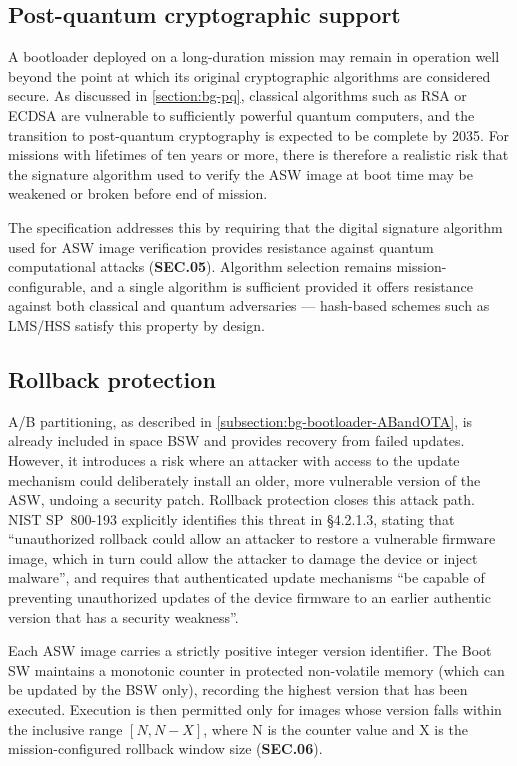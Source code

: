 \subsection{Post-quantum cryptographic support}

A bootloader deployed on a long-duration mission may remain in operation well beyond the point at which its original cryptographic algorithms are considered secure. As discussed in \autoref{section:bg-pq}, classical algorithms such as RSA or ECDSA are vulnerable to sufficiently powerful quantum computers, and the transition to post-quantum cryptography is expected to be complete by 2035. For missions with lifetimes of ten years or more, there is therefore a realistic risk that the signature algorithm used to verify the ASW image at boot time may be weakened or broken before end of mission.

The specification addresses this by requiring that the digital signature algorithm used for ASW image verification provides resistance against quantum computational attacks (\textbf{SEC.05}). Algorithm selection remains mission-configurable, and a single algorithm is sufficient provided it offers resistance against both classical and quantum adversaries — hash-based schemes such as LMS/HSS satisfy this property by design.

\subsection{Rollback protection}

A/B partitioning, as described in \autoref{subsection:bg-bootloader-ABandOTA}, is already included in space BSW and provides recovery from failed updates. However, it introduces a risk where an attacker with access to the update mechanism could deliberately install an older, more vulnerable version of the ASW, undoing a security patch. Rollback protection closes this attack path. NIST SP~800-193 \cite{NIST-sp-800-193} explicitly identifies this threat in §4.2.1.3, stating that ``unauthorized rollback could allow an attacker to restore a vulnerable firmware image, which in turn could allow the attacker to damage the device or inject malware'', and requires that authenticated update mechanisms ``be capable of preventing unauthorized updates of the device firmware to an earlier authentic version that has a security weakness''.

Each ASW image carries a strictly positive integer version identifier. The Boot SW maintains a monotonic counter in protected non-volatile memory (which can be updated by the BSW only), recording the highest version that has been executed. Execution is then permitted only for images whose version falls within the inclusive range $[N, N - X]$, where N is the counter value and X is the mission-configured rollback window size (\textbf{SEC.06}).

